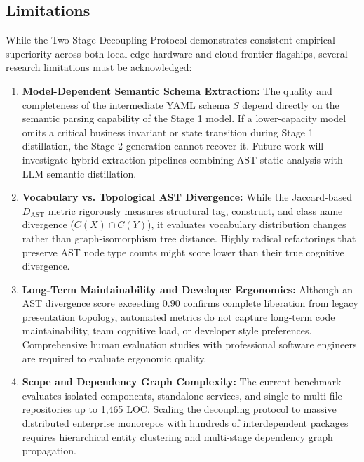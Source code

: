 \documentclass[10pt,journal,compsoc]{IEEEtran}
\begin{document}
\subsection{Limitations}
While the Two-Stage Decoupling Protocol demonstrates consistent empirical superiority across both local edge hardware and cloud frontier flagships, several research limitations must be acknowledged:
\begin{enumerate}
    \item \textbf{Model-Dependent Semantic Schema Extraction:} The quality and completeness of the intermediate YAML schema $S$ depend directly on the semantic parsing capability of the Stage 1 model. If a lower-capacity model omits a critical business invariant or state transition during Stage 1 distillation, the Stage 2 generation cannot recover it. Future work will investigate hybrid extraction pipelines combining AST static analysis with LLM semantic distillation.
    \item \textbf{Vocabulary vs. Topological AST Divergence:} While the Jaccard-based $D_{\text{AST}}$ metric rigorously measures structural tag, construct, and class name divergence ($C(X) \cap C(Y)$), it evaluates vocabulary distribution changes rather than graph-isomorphism tree distance. Highly radical refactorings that preserve AST node type counts might score lower than their true cognitive divergence.
    \item \textbf{Long-Term Maintainability and Developer Ergonomics:} Although an AST divergence score exceeding $0.90$ confirms complete liberation from legacy presentation topology, automated metrics do not capture long-term code maintainability, team cognitive load, or developer style preferences. Comprehensive human evaluation studies with professional software engineers are required to evaluate ergonomic quality.
    \item \textbf{Scope and Dependency Graph Complexity:} The current benchmark evaluates isolated components, standalone services, and single-to-multi-file repositories up to 1,465 LOC. Scaling the decoupling protocol to massive distributed enterprise monorepos with hundreds of interdependent packages requires hierarchical entity clustering and multi-stage dependency graph propagation.
\end{enumerate}
\end{document}

